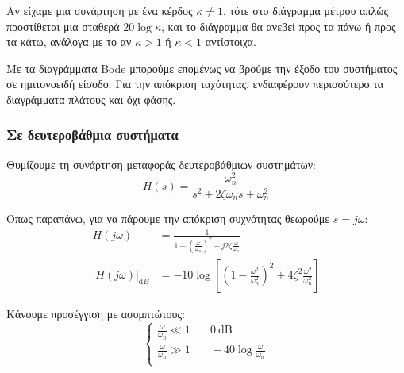 \documentclass[11pt,a4paper,notitlepage,fleqn,final]{article}
\begin{document}
Αν είχαμε μια συνάρτηση με ένα κέρδος \( κ \neq 1 \), τότε στο διάγραμμα μέτρου απλώς
προστίθεται μια σταθερά \( 20\log κ \), και το διάγραμμα θα ανεβεί προς τα πάνω ή προς τα
κάτω, ανάλογα με το αν \( κ > 1 \) ή \( κ < 1 \) αντίστοιχα.

Με τα διαγράμματα Bode μπορούμε επομένως να βρούμε την έξοδο του συστήματος σε ημιτονοειδή
είσοδο. Για την απόκριση ταχύτητας, ενδιαφέρουν περισσότερο τα διαγράμματα πλάτους και όχι
φάσης.

\subsubsection{Σε δευτεροβάθμια συστήματα}
Θυμίζουμε τη συνάρτηση μεταφοράς δευτεροβάθμιων συστημάτων:
\[
H(s) = \frac{\omega_n^2}{s^2+2ζ\omega_n s + \omega_n^2}
\]

Όπως παραπάνω, για να πάρουμε την απόκριση συχνότητας θεωρούμε \( s = j\omega  \):
\begin{align*}
	H(j\omega )&= \frac{1}{1-\left(\frac{\omega }{\omega_n}\right)^2
		+j2ζ\frac{\omega}{\omega_n}} \\
	\left\lvert H(j\omega ) \right\rvert_{\mathrm dB}
	&= -10\log\left[
	\left(1-\frac{\omega^2}{\omega_n^2}\right)^2+4ζ^2\frac{\omega^2}{\omega_n^2}
	\right]
\end{align*}

Κάνουμε προσέγγιση με ασυμπτώτους:
\[
\begin{cases}
	\frac{\omega}{\omega_n} \ll 1 &\quad 0\ \mathrm{dB} \\
	\frac{\omega}{\omega_n} \gg 1 &\quad -40\log\frac{\omega}{\omega_n} \\
\end{cases}
\]

\end{document}

